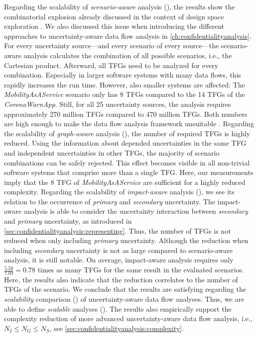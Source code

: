 Regarding the scalability of \emph{scenario-aware} analysis (), the results show the combinatorial explosion already discussed in the context of design space exploration \cite{koziolek_automated_2011}.
We also discussed this issue when introducing the different approaches to uncertainty-aware data flow analysis in \autoref{ch:confidentialityanalysis}.
For every uncertainty source---and every scenario of every source---the scenario-aware analysis calculates the combination of all possible scenarios, i.e., the Cartesian product.
Afterward, all \acp{TFG} need to be analyzed for every combination.
Especially in larger software systems with many data flows, this rapidly increases the run time.
However, also smaller systems are affected: The \emph{MobilityAsAService} scenario only has 8 \acp{TFG} compared to the 14 \acp{TFG} of the \emph{CoronaWarnApp}.
Still, for all 25 uncertainty sources, the analysis requires approximately 270 million \acp{TFG} compared to 470 million \acp{TFG}.
Both numbers are high enough to make the data flow analysis framework unsuitable \cite{schwickerath_tool-supported_2023}.
Regarding the scalability of \emph{graph-aware} analysis (), the number of required \acp{TFG} is highly reduced.
Using the information about depended uncertainties in the same \ac{TFG} and independent uncertainties in other \acp{TFG}, the majority of scenario combinations can be safely rejected.
This effect becomes visible in all non-trivial software systems that comprise more than a single \ac{TFG}.
Here, our measurements imply that the 8 \ac{TFG} of \emph{MobilityAsAService} are sufficient for a highly reduced complexity.
Regarding the scalability of \emph{impact-aware} analysis (), we see its relation to the occurrence of \emph{primary} and \emph{secondary} uncertainty.
The impact-aware analysis is able to consider the uncertainty interaction between \emph{secondary} and \emph{primary} uncertainty, as introduced in \autoref{sec:confidentialityanalysis:representing}.
Thus, the number of \acp{TFG} is not reduced when only including \emph{primary} uncertainty.
Although the reduction when including \emph{secondary} uncertainty is not as large compared to scenario-aware analysis, it is still notable.
On average, impact-aware analysis requires only $\frac{5.50}{7.09} = 0.78$ times as many \acp{TFG} for the same result in the evaluated scenarios.
Here, the results also indicate that the reduction correlates to the number of \acp{TFG} of the scenario.
We conclude that the results are satisfying regarding the \emph{scalability} comparison () of uncertainty-aware data flow analyses.
Thus, we are able to define \emph{scalable} analyses ().
The results also empirically support the complexity reduction of more advanced uncertainty-aware data flow analysis, i.e., $N_{I} \leq N_{G} \leq N_{S}$, see \autoref{sec:confidentialityanalysis:complexity}.


